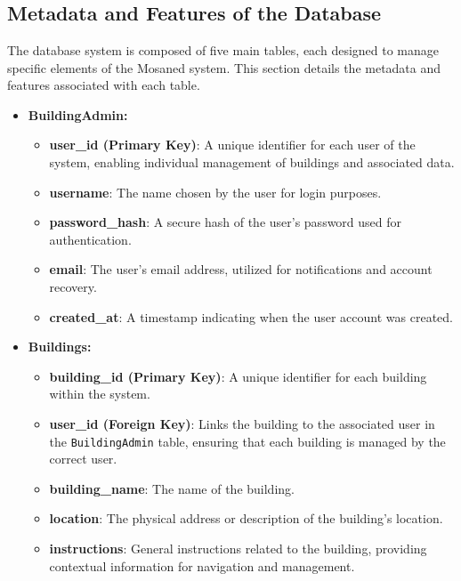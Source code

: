 \chapter{}
\section*{Metadata and Features of the Database}
\label{appendix:db_metadata}

The database system is composed of five main tables, each designed to manage specific elements of the Mosaned system. This section details the metadata and features associated with each table.

\begin{itemize}
	\item \textbf{BuildingAdmin:}
	\begin{itemize}
		\item \textbf{user\_id (Primary Key)}: A unique identifier for each user of the system, enabling individual management of buildings and associated data.
		\item \textbf{username}: The name chosen by the user for login purposes.
		\item \textbf{password\_hash}: A secure hash of the user's password used for authentication.
		\item \textbf{email}: The user's email address, utilized for notifications and account recovery.
		\item \textbf{created\_at}: A timestamp indicating when the user account was created.
	\end{itemize}
	
	\item \textbf{Buildings:}
	\begin{itemize}
		\item \textbf{building\_id (Primary Key)}: A unique identifier for each building within the system.
		\item \textbf{user\_id (Foreign Key)}: Links the building to the associated user in the \texttt{BuildingAdmin} table, ensuring that each building is managed by the correct user.
		\item \textbf{building\_name}: The name of the building.
		\item \textbf{location}: The physical address or description of the building's location.
		\item \textbf{instructions}: General instructions related to the building, providing contextual information for navigation and management.
	\end{itemize}
	

\end{itemize}
